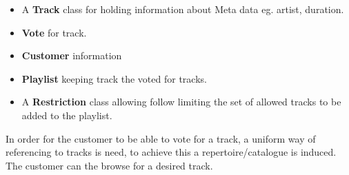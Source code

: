 \begin{itemize}
\item A \textbf{Track} class for holding information about Meta data eg. artist, duration.
\item \textbf{Vote} for track.
\item \textbf{Customer} information
\item \textbf{Playlist} keeping track the voted for tracks.
\item A \textbf{Restriction} class allowing follow limiting the set of allowed tracks to be added to the playlist.
\end{itemize}

In order for the customer to be able to vote for a track, a uniform way of referencing to tracks is need, to achieve this a repertoire/catalogue  is induced. The customer can the browse for a desired track.